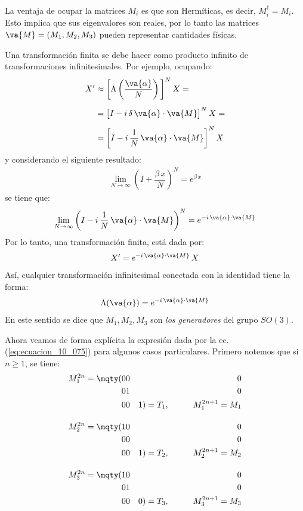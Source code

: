 La ventaja de ocupar la matrices $M_{i}$ es que son Hermíticas, es decir, \break \hfill $M_{i}^{\dagger} = M_{i}$. Esto implica que sus eigenvalores son reales, por lo tanto las matrices
$\va{M} = (M_{1} , M_{2} , M_{3})$ pueden representar cantidades físicas.
\par
Una transformación finita se debe hacer como producto infinito de transformaciones infinitesimales. Por ejemplo, ocupando:
\begin{align}
\begin{aligned}[b]
X^{\prime} &\approx \bigg[ \Lambda \left( \dfrac{\va{\alpha}}{N} \right) \bigg]^{N} \, X = \\[0.5em]
&= \big[ I - i \, \delta \, \va{\alpha} \cdot \va{M} \big]^{N} \, X = \\[0.5em]
&= \bigg[ I - i \, \dfrac{1}{N} \, \va{\alpha} \cdot \va{M} \bigg]^{N} \, X
\end{aligned}
\label{eq:ecuacion_10_071}
\end{align}
y considerando el siguiente resultado:
\begin{align}
\lim_{N \to \infty} \left(  I + \dfrac{\beta \, x}{N} \right)^{N} = e^{\beta \, x}
\label{eq:ecuacion_10_072}
\end{align}
se tiene que:
\begin{align}
\lim_{N \to \infty} \left(  I - i \, \dfrac{1}{N} \, \va{\alpha} \cdot \va{M} \right)^{N} = e^{- i \, \va{\alpha} \cdot \va{M}}
\label{eq:ecuacion_10_073}
\end{align}
Por lo tanto, una transformación finita, está dada por:
\begin{align}
X^{\prime} = e^{- i \, \va{\alpha} \cdot \va{M}} \, X
\label{eq:ecuacion_10_074}
\end{align}
Así, cualquier transformación infinitesimal conectada con la identidad tiene la forma:
\begin{align}
\Lambda (\va{\alpha}) = e^{- i \, \va{\alpha} \cdot \va{M}}
\label{eq:ecuacion_10_075}
\end{align}
En este sentido se dice que $M_{1}, M_{2}, M_{3}$ son \emph{los generadores} del grupo $SO(3)$.
\par
Ahora veamos de forma explícita la expresión dada por la ec.(\ref{eq:ecuacion_10_075}) para algunos casos particulares. Primero notemos que si $n \geq 1$, se tiene:
\begin{align}
M_{1}^{2n} = \mqty(0 & 0 & 0 \\ 0 & 1 & 0 \\ 0 & 0 & 1) = T_{1}, \hspace{1cm} M_{1}^{2n + 1} = M_{1}  \label{eq:ecuacion_10_076} \\[1em]
M_{2}^{2n} = \mqty(1 & 0 & 0 \\ 0 & 0 & 0 \\ 0 & 0 & 1) = T_{2}, \hspace{1cm} M_{2}^{2n + 1} = M_{2}  \label{eq:ecuacion_10_077} \\[1em]
M_{3}^{2n} = \mqty(1 & 0 & 0 \\ 0 & 1 & 0 \\ 0 & 0 & 0) = T_{3}, \hspace{1cm} M_{3}^{2n + 1} = M_{3}  \label{eq:ecuacion_10_078}
\end{align}
